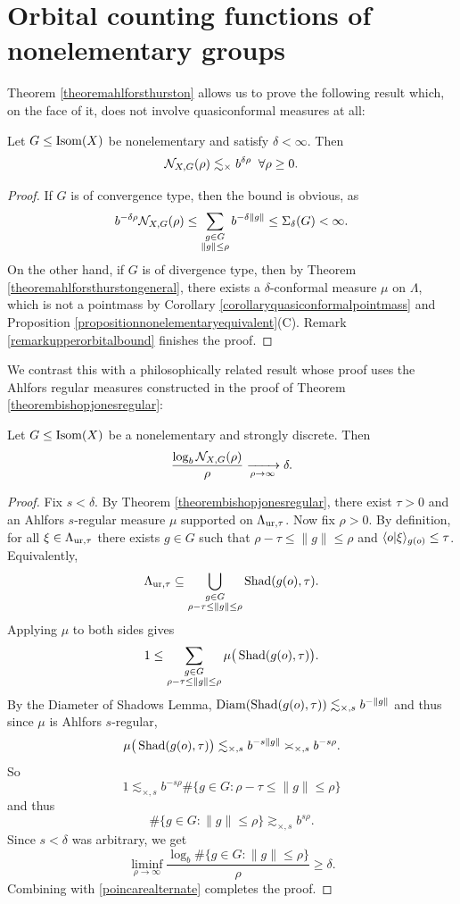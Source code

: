 \section{Orbital counting functions of nonelementary groups}
Theorem \ref{theoremahlforsthurston} allows us to prove the following result which, on the face of it, does not involve quasiconformal measures at all:

\begin{corollary}
\label{corollaryupperorbitalbound}
Let $G\leq\operatorname{Isom}(X)$ be nonelementary and satisfy $\delta < \infty$. Then
\[
\mathcal N_{X,G}(\rho) \lesssim_\times b^{\delta\rho} \;\;\forall \rho\geq 0.
\]
\end{corollary}
\begin{proof}
If $G$ is of convergence type, then the bound is obvious, as
\[
b^{-\delta \rho} \mathcal N_{X,G}(\rho) \leq \sum_{\substack{g\in G \\ \|g\| \leq \rho}} b^{-\delta\|g\|} \leq \Sigma_\delta(G) < \infty.
\]
On the other hand, if $G$ is of divergence type, then by Theorem \ref{theoremahlforsthurstongeneral}, there exists a $\delta$-conformal measure $\mu$ on $\Lambda$, which is not a pointmass by Corollary \ref{corollaryquasiconformalpointmass} and Proposition \ref{propositionnonelementaryequivalent}(C). Remark \ref{remarkupperorbitalbound} finishes the proof.
\end{proof}

We contrast this with a philosophically related result whose proof uses the Ahlfors regular measures constructed in the proof of Theorem \ref{theorembishopjonesregular}:

\begin{proposition}
Let $G\leq\operatorname{Isom}(X)$ be a nonelementary and strongly discrete. Then
\[
\frac{\log_b\mathcal N_{X,G}(\rho)}{\rho} \xrightarrow[\rho\to\infty]{} \delta.
\]
\end{proposition}
\begin{proof}
Fix $s < \delta$. By Theorem \ref{theorembishopjonesregular}, there exist $\tau > 0$ and an Ahlfors $s$-regular measure $\mu$ supported on $\Lambda_{\mathrm{ur},\tau}$. Now fix $\rho > 0$. By definition, for all $\xi\in\Lambda_{\mathrm{ur},\tau}$ there exists $g\in G$ such that $\rho - \tau \leq \|g\| \leq \rho$ and $\langle o | \xi \rangle_{g(o)} \leq \tau$. Equivalently,
\[
\Lambda_{\mathrm{ur},\tau} \subseteq \bigcup_{\substack{g\in G \\ \rho - \tau \leq \|g\| \leq \rho}} \operatorname{Shad}(g(o),\tau).
\]
Applying $\mu$ to both sides gives
\[
1 \leq \sum_{\substack{g\in G \\ \rho - \tau \leq \|g\| \leq \rho}} \mu\big(\operatorname{Shad}(g(o),\tau)\big).
\]
By the Diameter of Shadows Lemma, $\operatorname{Diam}(\operatorname{Shad}(g(o),\tau)) \lesssim_{\times,s} b^{-\|g\|}$ and thus since $\mu$ is Ahlfors $s$-regular,
\[
\mu\big(\operatorname{Shad}(g(o),\tau)\big) \lesssim_{\times,s} b^{-s\|g\|} \asymp_{\times,s} b^{-s\rho}.
\]
So
\[
1 \lesssim_{\times,s} b^{-s\rho}\#\{g\in G : \rho - \tau \leq \|g\| \leq \rho\}
\]
and thus
\[
\#\{g\in G : \|g\| \leq \rho\} \gtrsim_{\times,s} b^{s\rho}.
\]
Since $s < \delta$ was arbitrary, we get
\[
\liminf_{\rho\to\infty} \frac{\log_b\#\{g\in G : \|g\| \leq \rho\}}{\rho} \geq \delta.
\]
Combining with \eqref{poincarealternate} completes the proof.
\end{proof}
